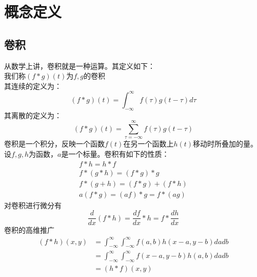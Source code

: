 \chapter{概念定义}
\section{卷积}
从数学上讲，卷积就是一种运算。其定义如下：\\%
我们称$(f*g)(t)$为$f,g$的卷积\\
其连续的定义为：%
\begin{equation}
  \label{eq:1}
  (f*g)(t) = \int_{-\infty}^{\infty}f(\tau)g(t-\tau)d\tau
\end{equation}
其离散的定义为：%
\begin{equation}
  \label{eq:2}
  (f*g)(t) = \sum_{\tau=-\infty}^{\infty}f(\tau)g(t-\tau)
\end{equation}
卷积是一个积分，反映一个函数$f(t)$在另一个函数上$h(t)$移动时所叠加的量。%
设$f,g,h$为函数，$a$是一个标量。卷积有如下的性质：%
\begin{gather}
  f*h = h*f\\
  f*(g*h) = (f*g)*g\\
  f*(g+h) = (f*g) + (f*h)\\
  a(f*g) = (af)*g = f*(ag)
\end{gather}
对卷积进行微分有
\begin{equation}
  \frac{d}{dx}(f*h) = \frac{df}{dx}*h = f*\frac{dh}{dx}
\end{equation}
卷积的高维推广
\begin{align}
  \label{eq:3}
  (f*h)(x,y) & = \int_{-\infty}^{\infty}\int_{-\infty}^{\infty}f(a,b)h(x-a,y-b)dadb\\
  & = \int_{-\infty}^{\infty}\int_{-\infty}^{\infty}f(x-a,y-b)h(a,b)dadb\\
  & = (h*f)(x,y)
\end{align}
